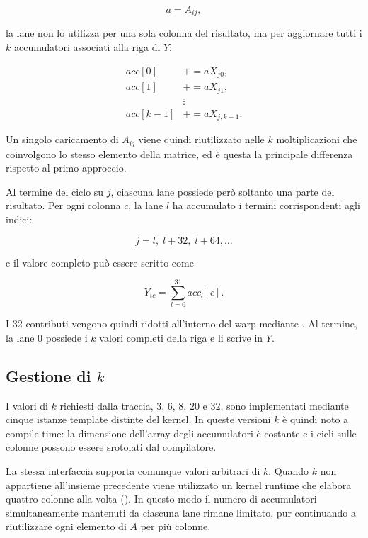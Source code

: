 \[
a = A_{ij},
\]

la lane non lo utilizza per una sola colonna del risultato, ma per
aggiornare tutti i $k$ accumulatori associati alla riga di $Y$:

\[
\begin{aligned}
acc[0]   &\mathrel{+}= aX_{j0},\\
acc[1]   &\mathrel{+}= aX_{j1},\\
          &\vdots\\
acc[k-1] &\mathrel{+}= aX_{j,k-1}.
\end{aligned}
\]

Un singolo caricamento di $A_{ij}$ viene quindi riutilizzato nelle $k$
moltiplicazioni che coinvolgono lo stesso elemento della matrice, ed è questa la principale
 differenza rispetto al primo approccio.

Al termine del ciclo su $j$, ciascuna lane possiede però soltanto una parte
del risultato. Per ogni colonna $c$, la lane $l$ ha accumulato i termini
corrispondenti agli indici:

\[
j = l,\;l+32,\;l+64,\ldots
\]

e il valore completo può essere scritto come

\begin{equation}
Y_{ic}
=
\sum_{l=0}^{31} acc_l[c].
\end{equation}

I 32 contributi vengono quindi ridotti all'interno del warp mediante
. Al termine, la lane $0$
possiede i $k$ valori completi della riga e li scrive in $Y$.

\subsection{Gestione di $k$}

I valori di $k$ richiesti dalla traccia, $3$, $6$, $8$, $20$ e $32$, sono
implementati mediante cinque istanze template distinte del kernel. In
queste versioni $k$ è quindi noto a compile time: la dimensione
dell'array degli accumulatori è costante e i cicli sulle colonne possono
essere srotolati dal compilatore.

La stessa interfaccia supporta comunque valori arbitrari di $k$. Quando
$k$ non appartiene all'insieme precedente viene utilizzato un kernel
runtime che elabora quattro colonne alla volta
(). In questo modo il numero di accumulatori
simultaneamente mantenuti da ciascuna lane rimane limitato, pur continuando
a riutilizzare ogni elemento di $A$ per più colonne.

